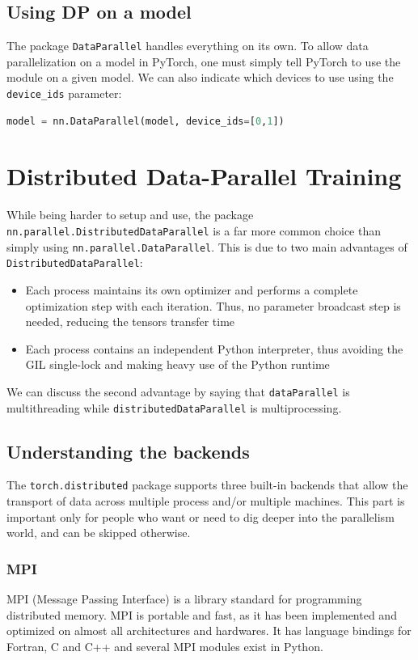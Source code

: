 \documentclass{article}
\begin{document}
\subsection{Using DP on a model}
The package \lstinline{DataParallel} handles everything on its own. To allow data parallelization on a model in PyTorch, one must simply tell PyTorch to use the module on a given model. We can also indicate which devices to use using the \lstinline{device_ids} parameter:

\begin{lstlisting}[language=Python]
model = nn.DataParallel(model, device_ids=[0,1])
\end{lstlisting}

\section{Distributed Data-Parallel Training}
While being harder to setup and use, the package \lstinline{nn.parallel.DistributedDataParallel} is a far more common choice than simply using \lstinline{nn.parallel.DataParallel}. This is due to two main advantages of \lstinline{DistributedDataParallel}:
\begin{itemize}
  \item Each process maintains its own optimizer and performs a complete optimization step with each iteration. Thus, no parameter broadcast step is needed, reducing the tensors transfer time
  \item Each process contains an independent Python interpreter, thus avoiding the GIL single-lock and making heavy use of the Python runtime
\end{itemize}

We can discuss the second advantage by saying that \lstinline{dataParallel} is \gls{multithreading} while \lstinline{distributedDataParallel} is \gls{multiprocessing}.

\subsection{Understanding the backends}
The \lstinline{torch.distributed} package supports three built-in backends that allow the transport of data across multiple process and/or multiple machines. This part is important only for people who want or need to dig deeper into the parallelism world, and can be skipped otherwise.

\subsubsection{MPI}
MPI (Message Passing Interface) is a library standard for programming distributed memory. MPI is portable and fast, as it has been implemented and optimized on almost all architectures and hardwares. It has language bindings for Fortran, C and C++ and several MPI modules exist in Python.
\end{document}
